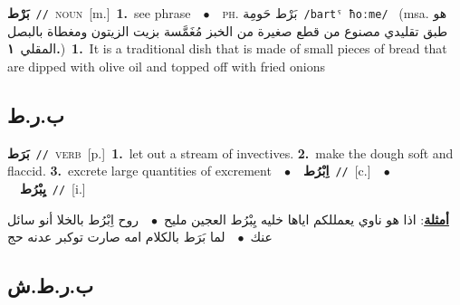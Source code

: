 \documentclass[10pt,a4paper,twoside]{article} %
\begin{document}
\begin{multicols}{2}
{\setlength\topsep{0pt}\textbf{\foreignlanguage{arabic}{بَرْط}}\ {\color{gray}\texttt{//}\color{black}}\ \textsc{noun}\ [m.]\ \textbf{1.}~see phrase\ \ $\bullet$\ \ \textsc{ph.} \color{gray} \foreignlanguage{arabic}{بَرْط حَومِة}\color{black}\ {\color{gray}\texttt{/{\sffamily bartˤ ħoːme}/}\color{black}}\ \color{gray} (msa. \foreignlanguage{arabic}{هو طبق تقليدي مصنوع من قطع صغيرة من الخبز مُغَمَّسة بزيت الزيتون ومغطاة بالبصل المقلي}~\foreignlanguage{arabic}{\textbf{١.}})\color{black}\ \textbf{1.}~It is a traditional dish that is made of small pieces of bread that are dipped with olive oil and topped off with fried onions\ } \vspace{2mm}

\vspace{-3mm}
\subsection*{\color{blue}\foreignlanguage{arabic}{ب.ر.ط}\color{blue}{ (ntws)}} 

{\setlength\topsep{0pt}\textbf{\foreignlanguage{arabic}{بَرَط}}\ {\color{gray}\texttt{//}\color{black}}\ \textsc{verb}\ [p.]\ \textbf{1.}~let out a stream of invectives.  \textbf{2.}~make the dough soft and flaccid.  \textbf{3.}~excrete large quantities of excrement\ \ $\bullet$\ \ \setlength\topsep{0pt}\textbf{\foreignlanguage{arabic}{اِبْرُط}}\ {\color{gray}\texttt{//}\color{black}}\ [c.]\ \ $\bullet$\ \ \setlength\topsep{0pt}\textbf{\foreignlanguage{arabic}{يِبْرُط}}\ {\color{gray}\texttt{//}\color{black}}\ [i.]\  \begin{flushright}\color{gray}\foreignlanguage{arabic}{\textbf{\underline{\foreignlanguage{arabic}{أمثلة}}}: اذا هو ناوي يعمللكم اياها خليه يِبْرُط العجين مليح\ $\bullet$\ \  روح اِبْرُط بالخلا أنو سائل عنك\ $\bullet$\ \  لما بَرَط بالكلام امه صارت توكبر عدنه حج}\end{flushright}\color{black}} \vspace{2mm}

\vspace{-3mm}
\subsection*{\color{blue}\foreignlanguage{arabic}{ب.ر.ط.ش}\color{blue}{ (ntws)}} 


\end{multicols}
\end{document}
